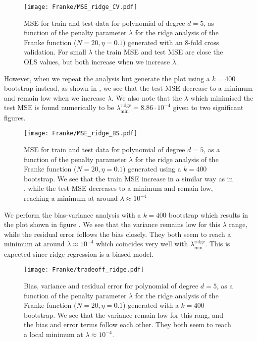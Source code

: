         \begin{figure}
            \texttt{[image: Franke/MSE\_ridge\_CV.pdf]}
            \caption{MSE for train and test data for polynomial of degree $d=5$, as function of the penalty parameter $\lambda$ for the ridge analysis of the Franke function ($N=20, \eta=0.1$) generated with an 8-fold cross validation. For small $\lambda$ the train MSE and test MSE are close the OLS values, but both increase when we increase $\lambda$.}
            \label{fig:cross-validation_ridge}
        \end{figure}

        However, when we repeat the analysis but generate the plot using a $k=400$ bootstrap instead, as shown in , we see that the test MSE decrease to a minimum and remain low when we increase $\lambda$. We also note that the $\lambda$ which minimised the test MSE is found numerically to be $\lambda^\mathrm{ridge}_\mathrm{min} = 8.86\cdot 10^{-4}$ given to two significant figures. 


        \begin{figure}
            \texttt{[image: Franke/MSE\_ridge\_BS.pdf]}
            \caption{MSE for train and test data for polynomial of degree $d=5$, as a function of the penalty parameter $\lambda$ for the ridge analysis of the Franke function ($N=20, \eta=0.1$) generated using a $k=400$ bootstrap. We see that the train MSE increase in a similar way as in , while the test MSE decreases to a minimum and remain low, reaching a minimum at around $\lambda\approx 10^{-4}$ }
            \label{fig:bootstrapping_ridge}
        \end{figure}

        We perform the bias-variance analysis with a $k=400$ bootstrap which results in the plot shown in figure . We see that the variance remains low for this $\lambda$ range, while the residual error follows the bias closely. They both seem to reach a minimum at around $\lambda\approx 10^{-4}$ which coincides very well with $\lambda^\mathrm{ridge}_\mathrm{min}$. This is expected since ridge regression is a biased model. 

        \begin{figure}
            \texttt{[image: Franke/tradeoff\_ridge.pdf]}
            \caption{Bias, variance and residual error for polynomial of degree $d=5$, as a function of the penalty parameter $\lambda$ for the ridge analysis of the Franke function ($N=20, \eta=0.1$) generated with a $k=400$ bootstrap. We see that the variance remain low for this rang, and the bias and error terms follow each other. They both seem to reach a local minimum at $\lambda\approx 10^{-4}$.}
            \label{fig:bias_variance_ridge}
        \end{figure}

